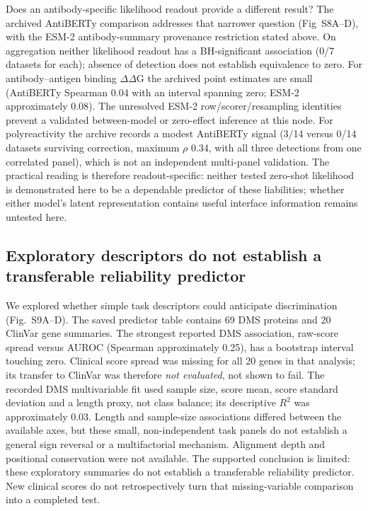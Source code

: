 \documentclass[12pt]{article}
\begin{document}
Does an antibody-specific likelihood readout provide a different result? The archived AntiBERTy comparison addresses that narrower question (Fig~S8A--D), with the ESM-2 antibody-summary provenance restriction stated above. On aggregation neither likelihood readout has a BH-significant association (0/7 datasets for each); absence of detection does not establish equivalence to zero. For antibody--antigen binding $\Delta$$\Delta$G the archived point estimates are small (AntiBERTy Spearman 0.04 with an interval spanning zero; ESM-2 approximately 0.08). The unresolved ESM-2 row/scorer/resampling identities prevent a validated between-model or zero-effect inference at this node. For polyreactivity the archive records a modest AntiBERTy signal (3/14 versus 0/14 datasets surviving correction, maximum $\rho$ 0.34, with all three detections from one correlated panel), which is not an independent multi-panel validation. The practical reading is therefore readout-specific: neither tested zero-shot likelihood is demonstrated here to be a dependable predictor of these liabilities; whether either model's latent representation contains useful interface information remains untested here.



\subsection{Exploratory descriptors do not establish a transferable reliability predictor}

We explored whether simple task descriptors could anticipate discrimination (Fig.~S9A--D). The saved predictor table contains 69 DMS proteins and 20 ClinVar gene summaries. The strongest reported DMS association, raw-score spread versus AUROC (Spearman approximately 0.25), has a bootstrap interval touching zero. Clinical score spread was missing for all 20 genes in that analysis; its transfer to ClinVar was therefore \textit{not evaluated}, not shown to fail. The recorded DMS multivariable fit used sample size, score mean, score standard deviation and a length proxy, not class balance; its descriptive $R^2$ was approximately 0.03. Length and sample-size associations differed between the available axes, but these small, non-independent task panels do not establish a general sign reversal or a multifactorial mechanism. Alignment depth and positional conservation were not available. The supported conclusion is limited: these exploratory summaries do not establish a transferable reliability predictor. New clinical scores do not retrospectively turn that missing-variable comparison into a completed test.
\end{document}
